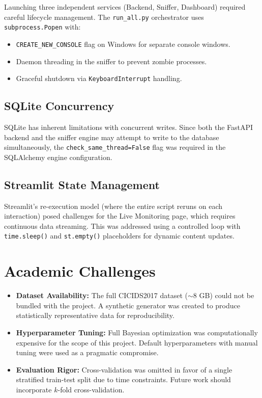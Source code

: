 Launching three independent services (Backend, Sniffer, Dashboard) required careful lifecycle management. The \texttt{run\_all.py} orchestrator uses \texttt{subprocess.Popen} with:
\begin{itemize}
    \item \texttt{CREATE\_NEW\_CONSOLE} flag on Windows for separate console windows.
    \item Daemon threading in the sniffer to prevent zombie processes.
    \item Graceful shutdown via \texttt{KeyboardInterrupt} handling.
\end{itemize}

\subsection{SQLite Concurrency}

SQLite has inherent limitations with concurrent writes. Since both the FastAPI backend and the sniffer engine may attempt to write to the database simultaneously, the \texttt{check\_same\_thread=False} flag was required in the SQLAlchemy engine configuration.

\subsection{Streamlit State Management}

Streamlit's re-execution model (where the entire script reruns on each interaction) posed challenges for the Live Monitoring page, which requires continuous data streaming. This was addressed using a controlled loop with \texttt{time.sleep()} and \texttt{st.empty()} placeholders for dynamic content updates.

\section{Academic Challenges}

\begin{itemize}
    \item \textbf{Dataset Availability:} The full CICIDS2017 dataset ($\sim$8 GB) could not be bundled with the project. A synthetic generator was created to produce statistically representative data for reproducibility.
    \item \textbf{Hyperparameter Tuning:} Full Bayesian optimization was computationally expensive for the scope of this project. Default hyperparameters with manual tuning were used as a pragmatic compromise.
    \item \textbf{Evaluation Rigor:} Cross-validation was omitted in favor of a single stratified train-test split due to time constraints. Future work should incorporate $k$-fold cross-validation.
\end{itemize}
